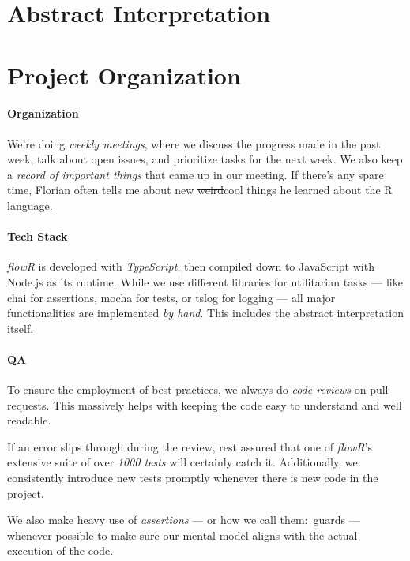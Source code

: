 \documentclass[color,coloraccent=red!60!black,listings]{poster}
\def\flowr{\textit{flowR}}
\begin{document}
\begin{multicols}{3}
\begin{minipage}{\dimexpr2\columnwidth+\columnsep\relax}
		\section*{Abstract Interpretation}
		\lipsum[1-2]
	\end{minipage}\vfill\columnbreak\null\columnbreak
	\section*{Project Organization}
	\paragraph{Organization} We're doing \emph{weekly meetings}, where we discuss the
	progress made in the past week, talk about open issues, and prioritize tasks for the
	next week. We also keep a \emph{record of important things} that came up in our
	meeting. If there's any spare time, Florian often tells me about new
	\sout{weird}cool things he learned about the R language.
	\paragraph{Tech Stack} \flowr{} is developed with \emph{TypeScript}, then compiled
	down to JavaScript with Node.js as its runtime. While we use different libraries for
	utilitarian tasks --- like chai for assertions, mocha for tests, or tslog for
	logging --- all major functionalities are implemented \emph{by hand}. This includes
	the abstract interpretation itself.
	\paragraph{QA} To ensure the employment of best practices, we always do \emph{code
	reviews} on pull requests. This massively helps with keeping the code easy to
	understand and well readable.\par
	If an error slips through during the review, rest assured that one of \flowr's
	extensive suite of over \emph{1000 tests} will certainly catch it. Additionally, we
	consistently introduce new tests promptly whenever there is new code in the
	project.\par
	We also make heavy use of \emph{assertions} --- or how we call them:~guards ---
	whenever possible to make sure our mental model aligns with the actual execution of
	the code.

\end{multicols}
\end{document}
